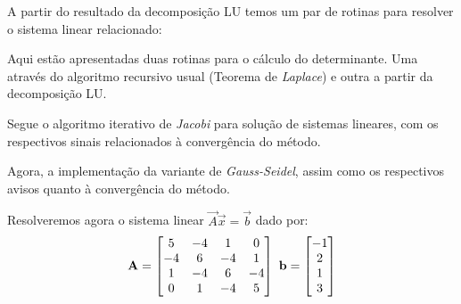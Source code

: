 \documentclass{homework}
\begin{document}
	
	
	\subsubquest[Resolução de um sistema $\vec{A} \vec{x} = \vec{b}$]
	
	A partir do resultado da decomposição LU temos um par de rotinas para resolver o sistema linear relacionado:
	
	
	
	
	Aqui estão apresentadas duas rotinas para o cálculo do determinante. Uma através do algoritmo recursivo usual (Teorema de \textit{Laplace}) e outra a partir da decomposição LU.
	
	
	
	\quest%
	
	
	Segue o algoritmo iterativo de \textit{Jacobi} para solução de sistemas lineares, com os respectivos sinais relacionados à convergência do método.
	
	
	
	
	Agora, a implementação da variante de \textit{Gauss-Seidel}, assim como os respectivos avisos quanto à convergência do método.
	
		
	
	\quest%
	
	\subsubquest[] Resolveremos agora o sistema linear $\vec{A}\vec{x} = \vec{b}$ dado por:
	$$
		\vec{A} = \left[\begin{array}{@{}cccc@{}}
		 5 & -4 &  1 &  0 \\
		-4 &  6 & -4 &  1 \\
		 1 & -4 &  6 & -4 \\
		 0 &  1 & -4 &  5
		\end{array}\right]
		~
		\vec{b} = \left[\begin{array}{@{}c@{}}
		-1 \\
		 2 \\
		 1 \\
		 3 
		\end{array}\right]
	$$
	
\end{document}
